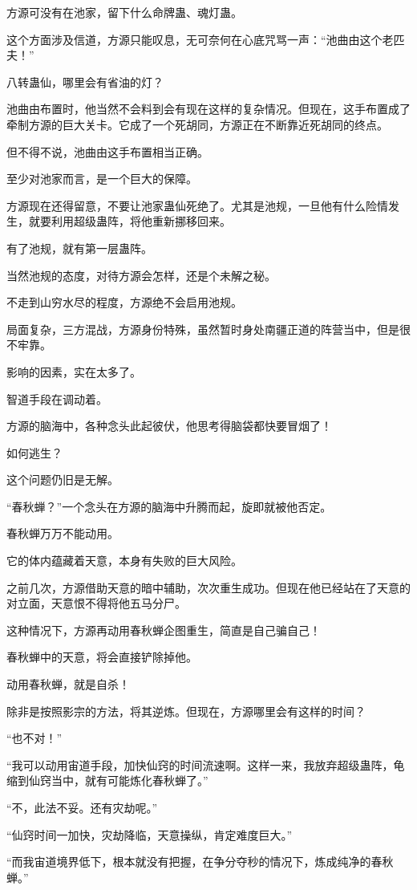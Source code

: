 \begin{this_body}
方源可没有在池家，留下什么命牌蛊、魂灯蛊。

这个方面涉及信道，方源只能叹息，无可奈何在心底咒骂一声：“池曲由这个老匹夫！”

八转蛊仙，哪里会有省油的灯？

池曲由布置时，他当然不会料到会有现在这样的复杂情况。但现在，这手布置成了牵制方源的巨大关卡。它成了一个死胡同，方源正在不断靠近死胡同的终点。

但不得不说，池曲由这手布置相当正确。

至少对池家而言，是一个巨大的保障。

方源现在还得留意，不要让池家蛊仙死绝了。尤其是池规，一旦他有什么险情发生，就要利用超级蛊阵，将他重新挪移回来。

有了池规，就有第一层蛊阵。

当然池规的态度，对待方源会怎样，还是个未解之秘。

不走到山穷水尽的程度，方源绝不会启用池规。

局面复杂，三方混战，方源身份特殊，虽然暂时身处南疆正道的阵营当中，但是很不牢靠。

影响的因素，实在太多了。

智道手段在调动着。

方源的脑海中，各种念头此起彼伏，他思考得脑袋都快要冒烟了！

如何逃生？

这个问题仍旧是无解。

“春秋蝉？”一个念头在方源的脑海中升腾而起，旋即就被他否定。

春秋蝉万万不能动用。

它的体内蕴藏着天意，本身有失败的巨大风险。

之前几次，方源借助天意的暗中辅助，次次重生成功。但现在他已经站在了天意的对立面，天意恨不得将他五马分尸。

这种情况下，方源再动用春秋蝉企图重生，简直是自己骗自己！

春秋蝉中的天意，将会直接铲除掉他。

动用春秋蝉，就是自杀！

除非是按照影宗的方法，将其逆炼。但现在，方源哪里会有这样的时间？

“也不对！”

“我可以动用宙道手段，加快仙窍的时间流速啊。这样一来，我放弃超级蛊阵，龟缩到仙窍当中，就有可能炼化春秋蝉了。”

“不，此法不妥。还有灾劫呢。”

“仙窍时间一加快，灾劫降临，天意操纵，肯定难度巨大。”

“而我宙道境界低下，根本就没有把握，在争分夺秒的情况下，炼成纯净的春秋蝉。”


\end{this_body}
